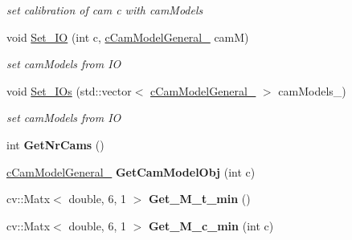 \begin{DoxyCompactItemize}
\begin{DoxyCompactList}\small\item\em set calibration of cam c with cam\+Models \end{DoxyCompactList}\item 
void \hyperlink{classMultiColSLAM_1_1cMultiCamSys___a50b9a082a2aaf50d1113a32c06e02fe7}{Set\+\_\+\+IO} (int c, \hyperlink{classMultiColSLAM_1_1cCamModelGeneral__}{c\+Cam\+Model\+General\+\_\+} camM)\hypertarget{classMultiColSLAM_1_1cMultiCamSys___a50b9a082a2aaf50d1113a32c06e02fe7}{}\label{classMultiColSLAM_1_1cMultiCamSys___a50b9a082a2aaf50d1113a32c06e02fe7}

\begin{DoxyCompactList}\small\item\em set cam\+Models from IO \end{DoxyCompactList}\item 
void \hyperlink{classMultiColSLAM_1_1cMultiCamSys___aafd27e6e2abbb9e6785b1d562eb863a0}{Set\+\_\+\+I\+Os} (std\+::vector$<$ \hyperlink{classMultiColSLAM_1_1cCamModelGeneral__}{c\+Cam\+Model\+General\+\_\+} $>$ cam\+Models\+\_\+)\hypertarget{classMultiColSLAM_1_1cMultiCamSys___aafd27e6e2abbb9e6785b1d562eb863a0}{}\label{classMultiColSLAM_1_1cMultiCamSys___aafd27e6e2abbb9e6785b1d562eb863a0}

\begin{DoxyCompactList}\small\item\em set cam\+Models from IO \end{DoxyCompactList}\item 
int {\bfseries Get\+Nr\+Cams} ()\hypertarget{classMultiColSLAM_1_1cMultiCamSys___ad06f07ebb253231e62be662b271b29fa}{}\label{classMultiColSLAM_1_1cMultiCamSys___ad06f07ebb253231e62be662b271b29fa}

\item 
\hyperlink{classMultiColSLAM_1_1cCamModelGeneral__}{c\+Cam\+Model\+General\+\_\+} {\bfseries Get\+Cam\+Model\+Obj} (int c)\hypertarget{classMultiColSLAM_1_1cMultiCamSys___a83137646fa518549ea0dbc47bff7a19b}{}\label{classMultiColSLAM_1_1cMultiCamSys___a83137646fa518549ea0dbc47bff7a19b}

\item 
cv\+::\+Matx$<$ double, 6, 1 $>$ {\bfseries Get\+\_\+\+M\+\_\+t\+\_\+min} ()\hypertarget{classMultiColSLAM_1_1cMultiCamSys___a4d73aea59fec86187cae86fad0abcf65}{}\label{classMultiColSLAM_1_1cMultiCamSys___a4d73aea59fec86187cae86fad0abcf65}

\item 
cv\+::\+Matx$<$ double, 6, 1 $>$ {\bfseries Get\+\_\+\+M\+\_\+c\+\_\+min} (int c)\hypertarget{classMultiColSLAM_1_1cMultiCamSys___a96e69baff40ac22079a732070245d9d9}{}\label{classMultiColSLAM_1_1cMultiCamSys___a96e69baff40ac22079a732070245d9d9}


\end{DoxyCompactItemize}
